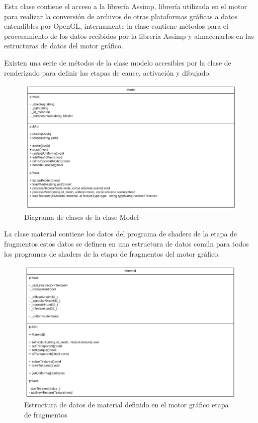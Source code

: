 \documentclass[a4paper, 17pt]{book}
\begin{document}
Esta clase contiene el acceso a la librería Assimp, librería utilizada en el motor para realizar la conversión de archivos de otras
plataformas gráficas a datos entendibles por OpenGL, internamente la clase contiene métodos para el procesamiento de los datos
recibidos por la librería Assimp y almacenarlos en las estructuras de datos del motor gráfico. 

Existen una serie de métodos de la clase modelo accesibles por la clase de renderizado para definir las etapas de cauce, activación
y dibujado.

\begin{figure}[hbt!]
    \centering
    \includegraphics[scale=0.25, keepaspectratio]{img/Model.png}
    \caption{Diagrama de clases de la clase Model}
    \label{figura:Model}
\end{figure}

La clase material contiene los datos del  programa de shaders de la etapa de fragmentos estos datos se definen en una estructura de
datos común para todos los programas de shaders de la etapa de fragmentos del motor gráfico.

\begin{figure}[hbt!]
    \centering
    \includegraphics[scale=0.25, keepaspectratio]{img/Material.png}
    \caption{Estructura de datos de material definido en el motor gráfico etapa de fragmentos}
    \label{figura:Material}
\end{figure}
\end{document}
